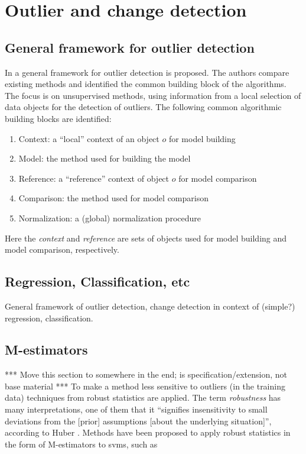 \section{Outlier and change detection}\label{sec:outlier_detection}

\subsection{General framework for outlier detection}
In \cite{schubert2012local} a general framework for outlier detection is proposed.
The authors compare existing methods and identified the common building block of the algorithms.
The focus is on unsupervised methods, using information from a local selection of data objects for the detection of outliers.
The following common algorithmic building blocks are identified:

\begin{enumerate}
  \item Context: a ``local'' context of an object $o$ for model building
  \item Model: the method used for building the model
  \item Reference: a ``reference'' context of object $o$ for model comparison
  \item Comparison: the method used for model comparison
  \item Normalization: a (global) normalization procedure
\end{enumerate}

Here the \emph{context} and \emph{reference} are sets of objects used for model building and model comparison, respectively.


\subsection{Regression, Classification, etc}

General framework of outlier detection, change detection in context of (simple?) regression, classification.

\subsection{M-estimators}
*** Move this section to somewhere in the end; is specification/extension, not base material ***
To make a method less sensitive to outliers (in the training data) techniques from robust statistics are applied.
The term \emph{robustness} has many interpretations, one of them that it ``signifies insensi­tivity to small deviations from the [prior] assumptions [about the underlying situation]'', according to Huber \cite{huber2009robust}.
Methods have been proposed to apply robust statistics in the form of M-estimators to \gls{svm}s, such as \cite{choi2009least,chen2004m,suykens1999least}